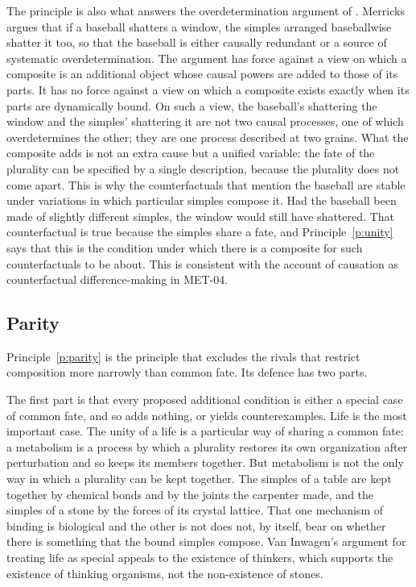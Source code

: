 \documentclass{situationist-preprint}
\begin{document}
The principle is also what answers the overdetermination argument of \citet{Merricks2001}. Merricks argues that if a baseball shatters a window, the simples arranged baseballwise shatter it too, so that the baseball is either causally redundant or a source of systematic overdetermination. The argument has force against a view on which a composite is an additional object whose causal powers are added to those of its parts. It has no force against a view on which a composite exists exactly when its parts are dynamically bound. On such a view, the baseball's shattering the window and the simples' shattering it are not two causal processes, one of which overdetermines the other; they are one process described at two grains. What the composite adds is not an extra cause but a unified variable: the fate of the plurality can be specified by a single description, because the plurality does not come apart. This is why the counterfactuals that mention the baseball are stable under variations in which particular simples compose it. Had the baseball been made of slightly different simples, the window would still have shattered. That counterfactual is true because the simples share a fate, and Principle~\ref{p:unity} says that this is the condition under which there is a composite for such counterfactuals to be about. This is consistent with the account of causation as counterfactual difference-making in MET-04.

\subsection{Parity}

Principle~\ref{p:parity} is the principle that excludes the rivals that restrict composition more narrowly than common fate. Its defence has two parts.

The first part is that every proposed additional condition is either a special case of common fate, and so adds nothing, or yields counterexamples. Life is the most important case. The unity of a life is a particular way of sharing a common fate: a metabolism is a process by which a plurality restores its own organization after perturbation and so keeps its members together. But metabolism is not the only way in which a plurality can be kept together. The simples of a table are kept together by chemical bonds and by the joints the carpenter made, and the simples of a stone by the forces of its crystal lattice. That one mechanism of binding is biological and the other is not does not, by itself, bear on whether there is something that the bound simples compose. Van Inwagen's argument for treating life as special appeals to the existence of thinkers, which supports the existence of thinking organisms, not the non-existence of stones.
\end{document}
